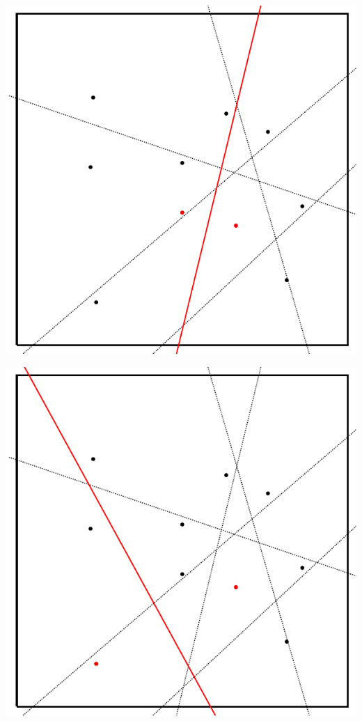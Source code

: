 \begin{frame}[fragile]
\begin{overprint}
\begin{center}
\includegraphics[height=0.9\textheight]{fig/voronoi-b5}
\par\end{center}

\begin{center}
\includegraphics[height=0.9\textheight]{fig/voronoi-b6}
\par\end{center}




\end{overprint}
\end{frame}
